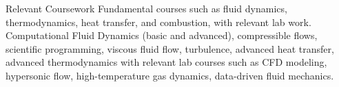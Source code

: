 \begin{rubric}{Relevant Coursework}
 Fundamental courses such as fluid dynamics,  thermodynamics, heat transfer, and combustion, with relevant lab work.
\entry*[Graduate] Computational Fluid Dynamics (basic and advanced), compressible flows, scientific programming, viscous fluid flow, turbulence, advanced heat transfer, advanced thermodynamics with relevant lab courses such as CFD modeling, hypersonic flow, high-temperature gas dynamics, data-driven fluid mechanics.
\end{rubric}